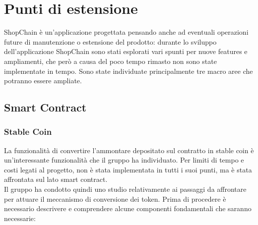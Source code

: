 \section{Punti di estensione} \label{section:punti_estensione}

ShopChain è un'applicazione progettata pensando anche ad eventuali operazioni future di manutenzione o
estensione del prodotto: durante lo sviluppo dell'applicazione ShopChain sono stati esplorati vari spunti per nuove features e ampliamenti, 
che però a causa del poco tempo rimasto non sono state implementate in tempo.
Sono state individuate principalmente tre macro aree che potranno essere ampliate.

\subsection{Smart Contract}

\subsubsection{Stable Coin}

La funzionalità di convertire l'ammontare depositato sul contratto in stable coin è un'interessante funzionalità che il gruppo ha individuato. Per limiti 
di tempo e costi legati al progetto, non è stata implementata in tutti i suoi punti, ma è stata affrontata sul lato smart contract.\\
Il gruppo ha condotto quindi uno studio relativamente ai passaggi da affrontare per attuare il meccanismo di conversione dei token\glo{}.
Prima di procedere è necessario descrivere e comprendere alcune componenti fondamentali che saranno necessarie:

